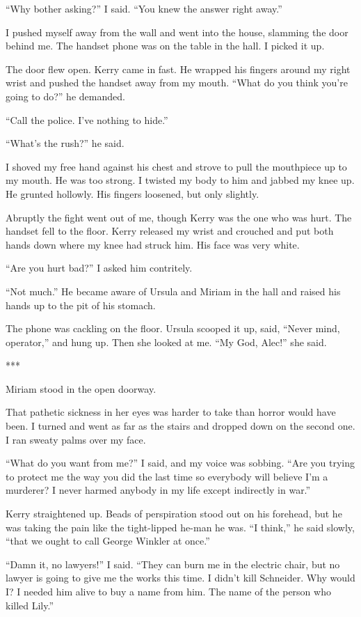 \documentclass{novel}
\begin{document}
“Why bother asking?” I said. “You knew the answer right away.”

I pushed myself away from the wall and went into the house, slamming the door behind me. The handset phone was on the table in the hall. I picked it up.

The door flew open. Kerry came in fast. He wrapped his fingers around my right wrist and pushed the handset away from my mouth. “What do you think you’re going to do?” he demanded.

“Call the police. I’ve nothing to hide.”

“What’s the rush?” he said.

I shoved my free hand against his chest and strove to pull the mouthpiece up to my mouth. He was too strong. I twisted my body to him and jabbed my knee up. He grunted hollowly. His fingers loosened, but only slightly.

Abruptly the fight went out of me, though Kerry was the one who was hurt. The handset fell to the floor. Kerry released my wrist and crouched and put both hands down where my knee had struck him. His face was very white.

“Are you hurt bad?” I asked him contritely.

“Not much.” He became aware of Ursula and Miriam in the hall and raised his hands up to the pit of his stomach.

The phone was cackling on the floor. Ursula scooped it up, said, “Never mind, operator,” and hung up. Then she looked at me. “My God, Alec!” she said.

***

Miriam stood in the open doorway.

That pathetic sickness in her eyes was harder to take than horror would have been. I turned and went as far as the stairs and dropped down on the second one. I ran sweaty palms over my face.

“What do you want from me?” I said, and my voice was sobbing. “Are you trying to protect me the way you did the last time so everybody will believe I’m a murderer? I never harmed anybody in my life except indirectly in war.”

Kerry straightened up. Beads of perspiration stood out on his forehead, but he was taking the pain like the tight-lipped he-man he was. “I think,” he said slowly, “that we ought to call George Winkler at once.”

“Damn it, no lawyers!” I said. “They can burn me in the electric chair, but no lawyer is going to give me the works this time. I didn’t kill Schneider. Why would I? I needed him alive to buy a name from him. The name of the person who killed Lily.”
\end{document}
